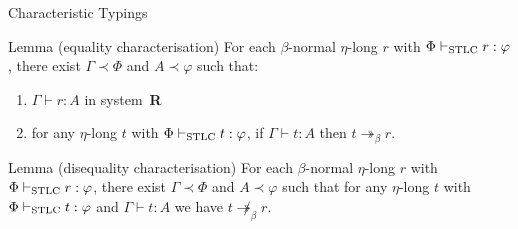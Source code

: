 \documentclass{beamer}
\renewcommand{\:}{\mbox{\,:\,}\xspace}
\begin{document}
  \begin{frame}{Characteristic Typings}

    \begin{block}{Lemma (equality characterisation)}
      For each $\beta$-normal $\eta$-long $r$ with $\Phi \vdash_{\textnormal{STLC}} r : \varphi$, there exist $\Gamma \prec \Phi$ and $A \prec \varphi$ such that:
      \begin{enumerate}
      \item $\Gamma \vdash r : A$ in system~\textbf{R}
      \item for any $\eta$-long $t$ with $\Phi \vdash_{\textnormal{STLC}} t : \varphi$, if $\Gamma \vdash t : A$ then $t \twoheadrightarrow_\beta r$.
      \end{enumerate}
    \end{block}

    \begin{block}{Lemma (disequality characterisation)}
      For each $\beta$-normal $\eta$-long $r$ with
      $\Phi \vdash_{\textnormal{STLC}} r : \varphi$, there exist
      $\Gamma \prec \Phi$ and $A \prec \varphi$ such that for any
      $\eta$-long $t$ with
      $\Phi \vdash_{\textnormal{STLC}} t : \varphi$ and
      $\Gamma \vdash t : A$ we have
      $t \not\twoheadrightarrow_\beta r$.
    \end{block}
    
  \end{frame}
  

\end{document}
